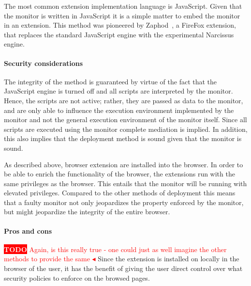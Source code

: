\documentclass{llncs}
\newcommand{\todo}[1]{\colorbox{red}{\textcolor{white}{\sffamily\bfseries\scriptsize TODO}} \textcolor{red}{#1} \textcolor{red}{$\blacktriangleleft$}}
\begin{document}
The most common extension implementation language is JavaScript. Given that
the monitor is written in JavaScript it is a simple matter to embed the 
monitor in an extension.
This method was pioneered by Zaphod~\cite{Zaphod}, a
FireFox extension, that replaces the standard JavaScript engine with the
experimental Narcissus~\cite{Narcissus} engine.


\paragraph{Security considerations}

The integrity of the method is guaranteed by virtue of the fact that the
JavaScript engine is turned off and all scripts are interpreted by the monitor.
Hence, the scripts are not active; rather, they are passed as data to the
monitor, and are only able to influence the execution environment implemented
by the monitor and not the general execution environment of the monitor itself.
Since all scripts are executed using the monitor complete mediation is implied.
In addition, this also implies that the deployment method is sound given that
the monitor is sound. 

As described above, browser extension are installed into the browser. In order
to be able to enrich the functionality of the browser, the extensions run with
the same privileges as the browser. This entails that the monitor will be
running with elevated privileges. Compared to the other methods of deployment
this means that a faulty monitor not only jeopardizes the property enforced by
the monitor, but might jeopardize the integrity of the entire browser.

\paragraph{Pros and cons}

\todo{Again, is this really true - one could just as well imagine the other 
  methods to provide the same}
Since the extension is installed on locally in the browser of the user, it has
the benefit of giving the user direct control over what security policies to 
enforce on the browsed pages.
\end{document}

